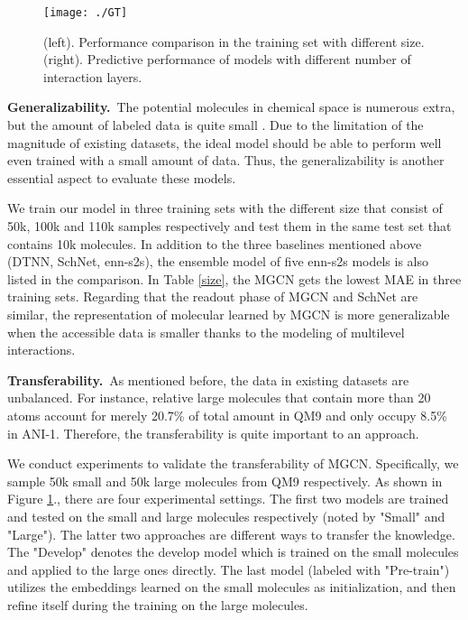 \documentclass[letterpaper]{article} \usepackage{bm}
\begin{document}
 
\begin{figure}[tpb]
    \centerline{\texttt{[image: ./GT]}}
    \caption{(left). Performance comparison in the training set with different size. (right). Predictive performance of models with different number of interaction layers.}
    \label{interaction}
\end{figure}

\textbf{Generalizability.}\ The potential molecules in chemical space is numerous extra, but the amount of labeled data is quite small \cite{schutt2017quantum}. Due to the limitation of the magnitude of existing datasets, the ideal model should be able to perform well even trained with a small amount of data. Thus, the generalizability is another essential aspect to evaluate these models.  

We train our model in three training sets with the different size that consist of 50k, 100k and 110k samples respectively and test them in the same test set that contains 10k molecules. In addition to the three baselines mentioned above (DTNN, SchNet, enn-s2s), the ensemble model of five enn-s2s models is also listed in the comparison. In Table \ref{size}, the MGCN gets the lowest MAE in three training sets. Regarding that the readout phase of MGCN and SchNet are similar, the representation of molecular learned by MGCN is more generalizable when the accessible data is smaller thanks to the modeling of multilevel interactions.   

\textbf{Transferability.}\ As mentioned before, the data in existing datasets are unbalanced. For instance, relative large molecules that contain more than 20 atoms account for merely 20.7\% of total amount in QM9 and only occupy 8.5\% in ANI-1. Therefore, the transferability is quite important to an approach.  

We conduct experiments to validate the transferability of MGCN. Specifically, we sample 50k small and 50k large molecules from QM9 respectively. As shown in Figure \ref{interaction}., there are four experimental settings. The first two models are trained and tested on the small and large molecules respectively (noted by "Small" and "Large"). The latter two approaches are different ways to transfer the knowledge. The "Develop" denotes the develop model which is trained on the small molecules and applied to the large ones directly. The last model (labeled with "Pre-train") utilizes the embeddings learned on the small molecules as initialization, and then refine itself during the training on the large molecules. 
\end{document}
